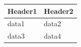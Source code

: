 \documentclass[11pt,a4paper]{article}
\begin{document}
\begin{table}[h]
\begin{tabular}{|l|l|}
\hline
Header1 & Header2 \\ \hline
data1 & data2 \\ \hline
data3 & data4 \\ \hline
\end{tabular}
\end{table}

\begin{figure}[h]
\end{figure}
\end{document}
